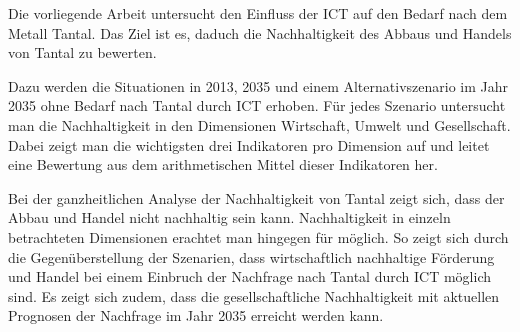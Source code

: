 Die vorliegende Arbeit untersucht den Einfluss der ICT auf den Bedarf nach dem Metall Tantal. Das Ziel ist es, daduch die Nachhaltigkeit des Abbaus und Handels von Tantal zu bewerten.

Dazu werden die Situationen in 2013, 2035 und einem Alternativszenario im Jahr 2035 ohne Bedarf nach Tantal durch ICT erhoben. Für jedes Szenario untersucht man die Nachhaltigkeit in den Dimensionen Wirtschaft, Umwelt und Gesellschaft. Dabei zeigt man die wichtigsten drei Indikatoren pro Dimension auf und leitet eine Bewertung aus dem arithmetischen Mittel dieser Indikatoren her.

Bei der ganzheitlichen Analyse der Nachhaltigkeit von Tantal zeigt sich, dass der Abbau und Handel nicht nachhaltig sein kann. Nachhaltigkeit in einzeln betrachteten Dimensionen erachtet man hingegen für möglich. So zeigt sich durch die Gegenüberstellung der Szenarien, dass wirtschaftlich nachhaltige Förderung und Handel bei einem Einbruch der Nachfrage nach Tantal durch ICT möglich sind. Es zeigt sich zudem, dass die gesellschaftliche Nachhaltigkeit mit aktuellen Prognosen der Nachfrage im Jahr 2035 erreicht werden kann.
